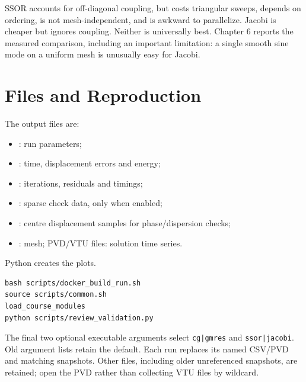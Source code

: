 SSOR accounts for off-diagonal coupling, but costs triangular sweeps, depends
on ordering, is not mesh-independent, and is awkward to parallelize.
Jacobi is cheaper but ignores coupling. Neither is universally best.
Chapter 6 reports the measured comparison, including an important limitation:
a single smooth sine mode on a uniform mesh is unusually easy for Jacobi.

\section{Files and Reproduction}
The output files are:
\begin{itemize}
 \item {}: run parameters;
 \item {}: time, displacement errors and energy;
 \item {}: iterations, residuals and timings;
 \item {}: sparse check data, only when enabled;
 \item {}: centre displacement samples for phase/dispersion checks;
 \item {}: mesh; PVD/VTU files: solution time series.
\end{itemize}
Python creates the plots.
\begin{verbatim}
bash scripts/docker_build_run.sh
source scripts/common.sh
load_course_modules
python scripts/review_validation.py
\end{verbatim}
The final two optional executable arguments select \texttt{cg|gmres} and
\texttt{ssor|jacobi}. Old argument lists retain the default.
Each run replaces its named CSV/PVD and matching snapshots.
Other files, including older unreferenced snapshots, are retained; open the
PVD rather than collecting VTU files by wildcard.
